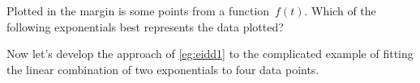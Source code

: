 \begin{activity}
Plotted in the margin is some points from a function~\(f(t)\).  
Which of the following exponentials best represents the data plotted?
\end{activity}


Now let's develop the approach of \autoref{eg:eidd1} to the complicated example of fitting the linear combination of two exponentials to four data points.



